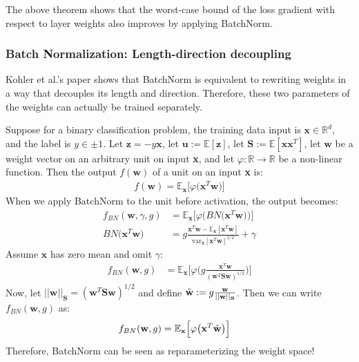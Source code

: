 \documentclass{article}
\begin{document}
The above theorem shows that the worst-case bound of the loss gradient with respect to layer weights also improves by applying BatchNorm.

\subsubsection{Batch Normalization: Length-direction decoupling}

Kohler et al.'s paper \cite{decoupling} shows that BatchNorm is equivalent to rewriting weights in a way that decouples its length and direction. Therefore, these two parameters of the weights can actually be trained separately.

Suppose for a binary classification problem, the training data input is $\textbf{x}\in\mathbb{R}^d$, and the label is $y\in{\pm1}$. Let $\textbf{z}=-y\textbf{x}$, let $\textbf{u}:=\mathbb{E}[\textbf{z}]$, let $\textbf{S}:=\mathbb{E}[\textbf{xx}^T]$, let $\textbf{w}$ be a weight vector on an arbitrary unit on input \textbf{x}, and let $\varphi: \mathbb{R}\xrightarrow{}\mathbb{R}$ be a non-linear function. Then the output $f(\textbf{w})$ of a unit on an input \textbf{x} is:
\begin{align*}
	f(\textbf{w})=\mathbb{E}_{\textbf{x}}\big[\varphi\big(\textbf{x}^T\textbf{w}\big)\big]
\end{align*}
When we apply BatchNorm to the unit before activation, the output becomes:
\begin{align*}
	f_{BN}(\textbf{w},\gamma,g)&=\mathbb{E}_{\textbf{x}}\big[\varphi\big(BN\big(\textbf{x}^T\textbf{w}\big)\big)\big]\\
	BN\big(\textbf{x}^T\textbf{w}\big)&=g\frac{\textbf{x}^T\textbf{w}-\mathbb{E}_{\textbf{x}}[\textbf{x}^T\textbf{w}]}{\text{var}_\textbf{x}[\textbf{x}^T\textbf{w}]^{1/2}}+\gamma
\end{align*}
Assume $\textbf{x}$ has zero mean and omit $\gamma$:
\begin{align*}
	f_{BN}(\textbf{w},g)&=\mathbb{E}_{\textbf{x}}\Big[\varphi\Big(g\frac{\textbf{x}^T\textbf{w}}{(\textbf{w}^T\textbf{Sw})^{1/2}}\Big)\Big]
\end{align*}
Now, let $||\textbf{w}||_{\textbf{S}}=(\textbf{w}^T\textbf{Sw})^{1/2}$ and define $\Tilde{\textbf{w}}:=g\frac{\textbf{w}}{||\textbf{w}||_{\textbf{S}}}$. Then we can write  $f_{BN}(\textbf{w},g)$ as:
\begin{align*}
    f_{BN}(\textbf{w},g)&=\mathbb{E}_{\textbf{x}}\Big[\varphi\big(\textbf{x}^T\Tilde{\textbf{w}}\big)\Big]
\end{align*}
Therefore, BatchNorm can be seen as reparameterizing the weight space!
\end{document}
